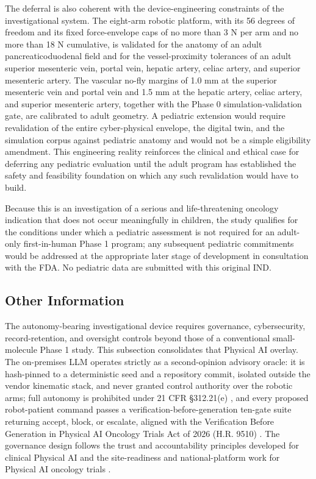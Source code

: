 The deferral is also coherent with the device-engineering constraints of the
investigational system. The eight-arm robotic platform, with its 56 degrees of
freedom and its fixed force-envelope caps of no more than 3 N per arm and no more
than 18 N cumulative, is validated for the anatomy of an adult pancreaticoduodenal
field and for the vessel-proximity tolerances of an adult superior mesenteric vein,
portal vein, hepatic artery, celiac artery, and superior mesenteric artery. The
vascular no-fly margins of 1.0 mm at the superior mesenteric vein and portal vein
and 1.5 mm at the hepatic artery, celiac artery, and superior mesenteric artery,
together with the Phase 0 simulation-validation gate, are calibrated to adult
geometry. A pediatric extension would require revalidation of the entire
cyber-physical envelope, the digital twin, and the simulation corpus against
pediatric anatomy and would not be a simple eligibility amendment. This engineering
reality reinforces the clinical and ethical case for deferring any pediatric
evaluation until the adult program has established the safety and feasibility
foundation on which any such revalidation would have to build.

Because this is an investigation of a serious and life-threatening oncology
indication that does not occur meaningfully in children, the study qualifies for
the conditions under which a pediatric assessment is not required for an adult-only
first-in-human Phase 1 program; any subsequent pediatric commitments would be
addressed at the appropriate later stage of development in consultation with the
FDA. No pediatric data are submitted with this original IND.

\subsection{Other Information}

The autonomy-bearing investigational device requires governance, cybersecurity,
record-retention, and oversight controls beyond those of a conventional
small-molecule Phase 1 study. This subsection consolidates that Physical AI overlay.
The on-premises LLM operates strictly as a second-opinion advisory oracle: it is
hash-pinned to a deterministic seed and a repository commit, isolated outside the
vendor kinematic stack, and never granted control authority over the robotic arms;
full autonomy is prohibited under 21 CFR \S 312.21(e) \cite{cfr312paiuni}, and every
proposed robot-patient command passes a verification-before-generation ten-gate
suite returning accept, block, or escalate, aligned with the Verification Before
Generation in Physical AI Oncology Trials Act of 2026 (H.R. 9510)
\cite{congress9510}. The governance design follows the trust and accountability
principles developed for clinical Physical AI \cite{clintrustpai,paiautospons} and
the site-readiness and national-platform work for Physical AI oncology trials
\cite{natlpaiplatf,paisitedocpk}.

